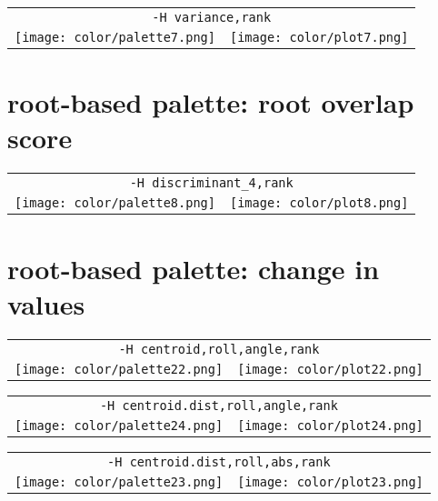 \documentclass{article}
\begin{document}
\begin{center}
\begin{tabular}{m{8cm}m{8cm}}
\multicolumn{2}{c}{\tt -H variance,rank} \\
\texttt{[image: color/palette7.png]} &
\texttt{[image: color/plot7.png]}
\end{tabular}
\end{center}

\newpage
\section{root-based palette: root overlap score}

\begin{center}
\begin{tabular}{m{8cm}m{8cm}}
\multicolumn{2}{c}{\tt -H discriminant\_4,rank} \\
\texttt{[image: color/palette8.png]} &
\texttt{[image: color/plot8.png]}
\end{tabular}
\end{center}

\newpage
\section{root-based palette: change in values}

\begin{center}
\begin{tabular}{m{8cm}m{8cm}}
\multicolumn{2}{c}{\tt -H centroid,roll,angle,rank} \\
\texttt{[image: color/palette22.png]} &
\texttt{[image: color/plot22.png]}
\end{tabular}
\end{center}

\begin{center}
\begin{tabular}{m{8cm}m{8cm}}
\multicolumn{2}{c}{\tt -H centroid.dist,roll,angle,rank} \\
\texttt{[image: color/palette24.png]} &
\texttt{[image: color/plot24.png]}
\end{tabular}
\end{center}


\begin{center}
\begin{tabular}{m{8cm}m{8cm}}
\multicolumn{2}{c}{\tt -H centroid.dist,roll,abs,rank} \\
\texttt{[image: color/palette23.png]} &
\texttt{[image: color/plot23.png]}
\end{tabular}
\end{center}
\end{document}
